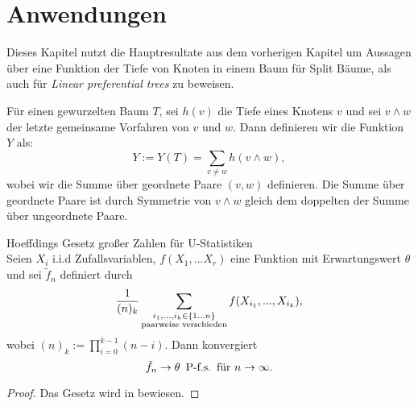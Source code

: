 \chapter{Anwendungen}
Dieses Kapitel nutzt die Hauptresultate aus dem vorherigen Kapitel um Aussagen über eine Funktion der Tiefe von Knoten in einem Baum für Split Bäume, als auch für \textit{Linear preferential trees} zu beweisen.  
\begin{Definition}
    \label{definition height trees}
    Für einen gewurzelten Baum $T$, sei $h(v)$ die Tiefe eines Knotens $v$ und sei $v\wedge w$ der letzte gemeinsame Vorfahren von $v$ und $w$. Dann definieren wir die Funktion $Y$ als:
    \[
        Y := Y(T) = \sum_{v \neq w}h(v \wedge w),
    \]
    wobei wir die Summe über geordnete Paare $(v,w)$ definieren. Die Summe über geordnete Paare ist durch Symmetrie von $v \wedge w$ gleich dem doppelten der Summe über ungeordnete Paare. 
\end{Definition}
\begin{theorem}\textnormal{Hoeffdings Gesetz großer Zahlen für U-Statistiken}\\
    \label{hoeffding theorem}
    Seien $X_i$ i.i.d Zufallsvariablen, $f(X_1,...X_r)$ eine Funktion mit Erwartungswert $\theta$ und sei $\tilde{f}_n$ definiert durch 
    \[
        \frac{1}{(n)_{k}}\sum_{\substack{i_1,...,i_k \in \{1...n\}\\ \textnormal{paarweise verschieden}}}f(X_{i_1},...,X_{i_k}),
    \]
    wobei $(n)_k := \prod_{i=0}^{k-1}(n-i)$.
    Dann konvergiert 
    \[
        \tilde{f}_n  \rightarrow \theta \hspace{5pt} \textnormal{P-f.s.} \hspace{5pt} \textnormal{für } n \rightarrow \infty.
    \]
\begin{proof}
    Das Gesetz wird in \cite{hoeffding1961strong} bewiesen.
\end{proof}
\end{theorem}
